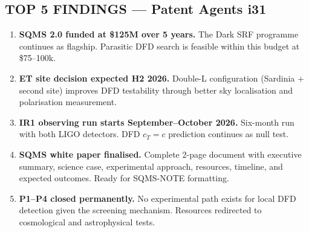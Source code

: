 \documentclass[11pt,a4paper]{article}
\begin{document}
\subsection{TOP 5 FINDINGS --- Patent Agents i31}

\begin{enumerate}
\item \textbf{SQMS 2.0 funded at \$125M over 5 years.} The Dark SRF programme continues as flagship. Parasitic DFD search is feasible within this budget at \$75--100k.

\item \textbf{ET site decision expected H2 2026.} Double-L configuration (Sardinia + second site) improves DFD testability through better sky localisation and polarisation measurement.

\item \textbf{IR1 observing run starts September--October 2026.} Six-month run with both LIGO detectors. DFD $c_T = c$ prediction continues as null test.

\item \textbf{SQMS white paper finalised.} Complete 2-page document with executive summary, science case, experimental approach, resources, timeline, and expected outcomes. Ready for SQMS-NOTE formatting.

\item \textbf{P1--P4 closed permanently.} No experimental path exists for local DFD detection given the screening mechanism. Resources redirected to cosmological and astrophysical tests.
\end{enumerate}
\end{document}

